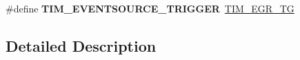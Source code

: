 \begin{DoxyCompactItemize}
\item 
\hypertarget{group___t_i_m___event___source_ga85573ed76442490db67e4b759fe6d901}{\#define {\bfseries T\-I\-M\-\_\-\-E\-V\-E\-N\-T\-S\-O\-U\-R\-C\-E\-\_\-\-T\-R\-I\-G\-G\-E\-R}~\hyperlink{group___peripheral___registers___bits___definition_ga2eabface433d6adaa2dee3df49852585}{T\-I\-M\-\_\-\-E\-G\-R\-\_\-\-T\-G}}\label{group___t_i_m___event___source_ga85573ed76442490db67e4b759fe6d901}

\end{DoxyCompactItemize}


\subsection{Detailed Description}
